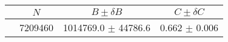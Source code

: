 \begin{tabular}{lccc}
\hline
    &   $N$   & $B \pm \delta B$  &  $C \pm \delta C$ \\
\hline
                               & 7209460    & 1014769.0  $\pm$ 44786.6 & 0.662      $\pm$ 0.006 \\
\hline
\end{tabular}
